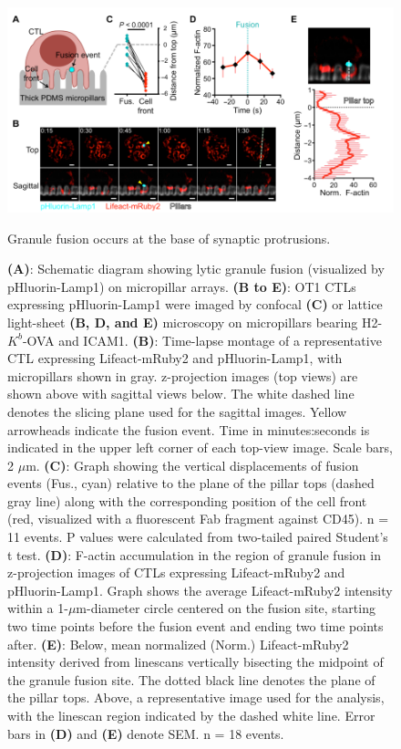 \begin{figure}[htbp]
	\centering
	\includegraphics[width=\textwidth]{../figures/chapter2/fig2degranulation.png}
	\caption{Granule fusion occurs at the base of synaptic protrusions.}
	\caption*{\textbf{(A)}: Schematic diagram showing lytic granule fusion (visualized by pHluorin-Lamp1) on micropillar arrays. \textbf{(B to E)}: OT1 CTLs expressing pHluorin-Lamp1 were imaged by confocal \textbf{(C)} or lattice light-sheet \textbf{(B, D, and E)} microscopy on micropillars bearing H2-$K^{b}$-OVA and ICAM1. \textbf{(B)}: Time-lapse montage of a representative CTL expressing Lifeact-mRuby2 and pHluorin-Lamp1, with micropillars shown in gray. z-projection images (top views) are shown above with sagittal views below. The white dashed line denotes the slicing plane used for the sagittal images. Yellow arrowheads indicate the fusion event. Time in minutes:seconds is indicated in the upper left corner of each top-view image. Scale bars, 2 $\mu$m. \textbf{(C)}: Graph showing the vertical displacements of fusion events (Fus., cyan) relative to the plane of the pillar tops (dashed gray line) along with the corresponding position of the cell front (red, visualized with a fluorescent Fab fragment against CD45). n = 11 events. P values were calculated from two-tailed paired Student’s t test. \textbf{(D)}: F-actin accumulation in the region of granule fusion in z-projection images of CTLs expressing Lifeact-mRuby2 and pHluorin-Lamp1. Graph shows the average Lifeact-mRuby2 intensity within a 1-$\mu$m-diameter circle centered on the fusion site, starting two time points before the fusion event and ending two time points after. \textbf{(E)}: Below, mean normalized (Norm.) Lifeact-mRuby2 intensity derived from linescans vertically bisecting the midpoint of the granule fusion site. The dotted black line denotes the plane of the pillar tops. Above, a representative image used for the analysis, with the linescan region indicated by the dashed white line. Error bars in \textbf{(D)} and \textbf{(E)} denote SEM. n = 18 events.}
	\label{fig:fig2degranulation}
\end{figure}

